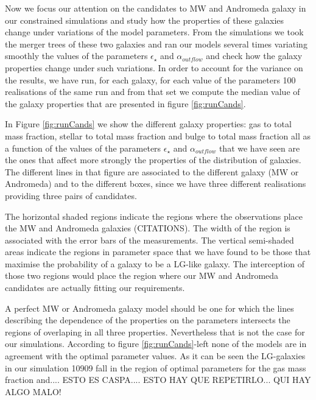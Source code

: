 \documentclass[useAMS,usenatbib]{mn2e}
\begin{document}
Now we focus our attention on the candidates to MW and Andromeda
galaxy in our constrained simulations and study how the properties of
these galaxies change under variations of the model parameters. From
the simulations we took the merger trees of these two galaxies and ran
our models several times variating smoothly the values of the
parameters $\epsilon_{\star}$ and $\alpha_{outflow}$ and check how the
galaxy properties change under such variations. In order to account for
the variance on the results, we have run, for each galaxy, for each
value of the parameters 100 realisations of the same run and from that
set we compute the median value of the galaxy properties that are
presented in figure \ref{fig:runCands}.

In Figure \ref{fig:runCands} we show the different galaxy properties:
gas to total mass fraction, stellar to total mass fraction and bulge
to total mass fraction all as a function of the values of the
parameters $\epsilon_{\star}$ and $\alpha_{outflow}$ that we have seen
are the ones that affect more strongly the properties of the
distribution of galaxies. The different lines in that figure are
associated to the different galaxy (MW or Andromeda) and to the
different boxes, since we have three different realisations providing
three pairs of candidates.

The horizontal shaded regions indicate the regions where the
observations place the MW and Andromeda galaxies (CITATIONS). The
width of the region is associated with the error bars of the
measurements. The vertical semi-shaded areas indicate the regions in
parameter space that we have found to be those that maximise the
probability of a galaxy to be a LG-like galaxy. The interception of
those two regions would place the region where our MW and Andromeda
candidates are actually fitting our requirements.

A perfect MW or Andromeda galaxy model should be one for which the
lines describing the dependence of the properties on the parameters
intersects the regions of overlaping in all three
properties. Nevertheless that is not the case for our
simulations. According to figure \ref{fig:runCands}-left none of the
models are in agreement with the optimal parameter values. As it can
be seen the LG-galaxies in our simulation 10909 fall in the region of
optimal parameters for the gas mass fraction and.... ESTO ES
CASPA.... ESTO HAY QUE REPETIRLO... QUI HAY ALGO MALO!

\end{document}
